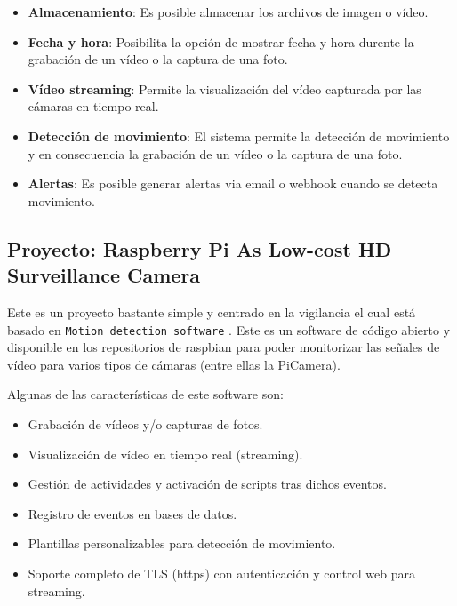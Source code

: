 \begin{itemize}
\item \textbf{Almacenamiento}: Es posible almacenar los archivos de imagen o vídeo.

\item \textbf{Fecha y hora}: Posibilita la opción de mostrar fecha y hora durente la grabación de un vídeo o la captura de una foto.

\item \textbf{Vídeo streaming}: Permite la visualización del vídeo capturada por las cámaras en tiempo real.

\item \textbf{Detección de movimiento}: El sistema permite la detección de movimiento y en consecuencia la grabación de un vídeo o la captura de una foto.

\item \textbf{Alertas}: Es posible generar alertas via email o webhook cuando se detecta movimiento.

\end{itemize}

\subsection{Proyecto: Raspberry Pi As Low-cost HD Surveillance Camera}\label{sec:pj2}

Este es un proyecto \cite{ref4} bastante simple y centrado en la vigilancia el cual está basado en \texttt{Motion detection software} \cite{ref5}. Este es un software de código abierto y disponible en los repositorios de raspbian para poder monitorizar las señales de vídeo para varios tipos de cámaras (entre ellas la PiCamera).

Algunas de las características de este software son:

\vspace{-0.5cm}

\begin{itemize}
\item Grabación de vídeos y/o capturas de fotos.
\item Visualización de vídeo en tiempo real (streaming).
\item Gestión de actividades y activación de scripts tras dichos eventos.
\item Registro de eventos en bases de datos.
\item Plantillas personalizables para detección de movimiento.
\item Soporte completo de TLS (https) con autenticación y control web para streaming.

\end{itemize}

